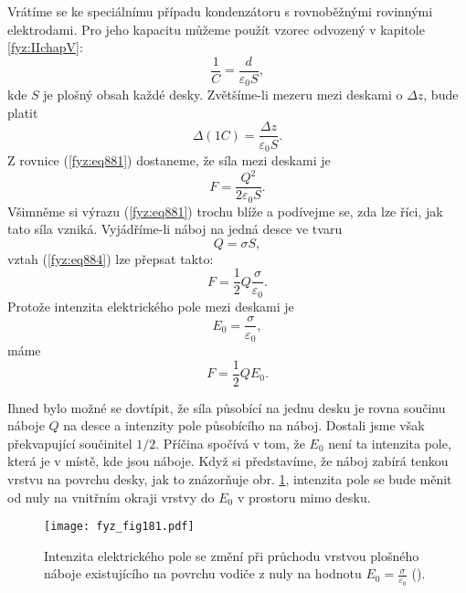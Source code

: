     Vrátíme se ke speciálnímu případu kondenzátoru s rovnoběžnými rovinnými elektrodami. Pro jeho
    kapacitu můžeme použít vzorec odvozený v kapitole \ref{fyz:IIchapV}:
    \begin{equation}\label{fyz:eq883}
      \dfrac{1}{C}=\dfrac{d}{\varepsilon_0S},
    \end{equation}
    kde \(S\) je plošný obsah každé desky. Zvětšíme-li mezeru mezi deskami o \(\Delta z\), bude
    platit
    \begin{equation*}
      Δ\left(1C\right)=\dfrac{Δz}{\varepsilon_0S}.
    \end{equation*}
    Z rovnice (\ref{fyz:eq881}) dostaneme, že síla mezi deskami je
    \begin{equation}\label{fyz:eq884}
      F=\dfrac{Q^2}{2\varepsilon_0S}.
    \end{equation}
    Všimněme si výrazu (\ref{fyz:eq881}) trochu blíže a podívejme se, zda lze říci, jak tato síla
    vzniká. Vyjádříme-li náboj na jedná desce ve tvaru
    \begin{equation*}
      Q=σS,
    \end{equation*}
    vztah (\ref{fyz:eq884}) lze přepsat takto:
    \begin{equation*}
      F=\dfrac{1}{2}Q\dfrac{σ}{\varepsilon_0}.
    \end{equation*}
    Protože intenzita elektrického pole mezi deskami je
    \begin{equation*}
      E_0=\dfrac{σ}{\varepsilon_0},
    \end{equation*}
    máme
    \begin{equation}\label{fyz:eq885}
      F=\dfrac{1}{2}QE_0.
    \end{equation}

    Ihned bylo možné se dovtípit, že síla působící na jednu desku je rovna součinu náboje \(Q\) na
    desce a intenzity pole působícího na náboj. Dostali jsme však překvapující součinitel \(1/2\).
    Příčina spočívá v tom, že \(E_0\) není ta intenzita pole, která je v místě, kde jsou náboje.
    Když si představíme, že náboj zabírá tenkou vrstvu na povrchu desky, jak to znázorňuje obr.
    \ref{fyz:fig181}, intenzita pole se bude měnit od nuly na vnitřním okraji vrstvy do \(E_0\) v
    prostoru mimo desku.
    
    \begin{figure}[ht!]  %
      \centering
      \texttt{[image: fyz\_fig181.pdf]}
      \caption{Intenzita elektrického pole se změní při průchodu vrstvou plošného náboje
              existujícího na povrchu vodiče z nuly na hodnotu \(E_0 =
              \frac{\sigma}{\varepsilon_0}\) (\cite[s.~145]{Feynman02}).}
      \label{fyz:fig181}
    \end{figure}

